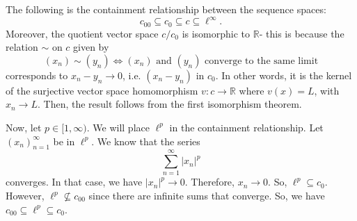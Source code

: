 \documentclass[a4paper, openany]{memoir}
\theoremstyle{definition}
\theoremstyle{plain}
\begin{document}
The following is the containment relationship between the sequence spaces:
\[c_{00} \subseteq c_0 \subseteq c \subseteq \ell^\infty.\]
Moreover, the quotient vector space $c/c_0$ is isomorphic to $\mathbb{R}$- this is because the relation $\sim$ on $c$ given by 
\[(x_n) \sim (y_n) \iff (x_n) \text{ and } (y_n) \text{ converge to the same limit}\]
corresponds to $x_n - y_n \to 0$, i.e. $(x_n - y_n)$ in $c_0$. In other words, it is the kernel of the surjective vector space homomorphism $v: c \to \mathbb{R}$ where $v(x) = L$, with $x_n \to L$. Then, the result follows from the first isomorphism theorem.

Now, let $p \in [1, \infty)$. We will place $\ell^p$ in the containment relationship. Let $(x_n)_{n=1}^\infty$ be in $\ell^p$. We know that the series
\[\sum_{n=1}^\infty |x_n|^p\]
converges. In that case, we have $|x_n|^p \to 0$. Therefore, $x_n \to 0$. So, $\ell^p \subseteq c_0$. However, $\ell^p \not\subseteq c_{00}$ since there are infinite sums that converge. So, we have $c_{00} \subseteq \ell^p \subseteq c_0$.
\end{document}
